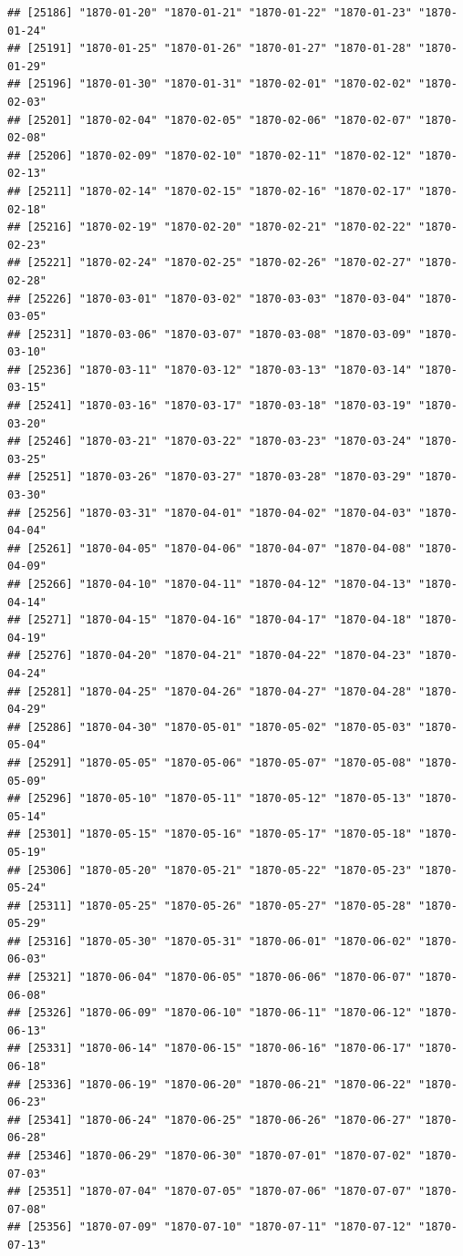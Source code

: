 \documentclass{article}\usepackage[]{graphicx}\usepackage[]{color}
\makeatletter
\newenvironment{kframe}{%
 \def\at@end@of@kframe{}%
 \ifinner\ifhmode%
  \def\at@end@of@kframe{\end{minipage}}%
  \begin{minipage}{\columnwidth}%
 \fi\fi%
 \def\FrameCommand##1{\hskip\@totalleftmargin \hskip-\fboxsep
 \colorbox{shadecolor}{##1}\hskip-\fboxsep
     \hskip-\linewidth \hskip-\@totalleftmargin \hskip\columnwidth}%
 \MakeFramed {\advance\hsize-\width
   \@totalleftmargin\z@ \linewidth\hsize
   \@setminipage}}%
 {\par\unskip\endMakeFramed%
 \at@end@of@kframe}
\newenvironment{knitrout}{}{} %
\makeatother
\begin{document}
\begin{description}
\begin{knitrout}
\begin{kframe}
\begin{verbatim}
## [25186] "1870-01-20" "1870-01-21" "1870-01-22" "1870-01-23" "1870-01-24"
## [25191] "1870-01-25" "1870-01-26" "1870-01-27" "1870-01-28" "1870-01-29"
## [25196] "1870-01-30" "1870-01-31" "1870-02-01" "1870-02-02" "1870-02-03"
## [25201] "1870-02-04" "1870-02-05" "1870-02-06" "1870-02-07" "1870-02-08"
## [25206] "1870-02-09" "1870-02-10" "1870-02-11" "1870-02-12" "1870-02-13"
## [25211] "1870-02-14" "1870-02-15" "1870-02-16" "1870-02-17" "1870-02-18"
## [25216] "1870-02-19" "1870-02-20" "1870-02-21" "1870-02-22" "1870-02-23"
## [25221] "1870-02-24" "1870-02-25" "1870-02-26" "1870-02-27" "1870-02-28"
## [25226] "1870-03-01" "1870-03-02" "1870-03-03" "1870-03-04" "1870-03-05"
## [25231] "1870-03-06" "1870-03-07" "1870-03-08" "1870-03-09" "1870-03-10"
## [25236] "1870-03-11" "1870-03-12" "1870-03-13" "1870-03-14" "1870-03-15"
## [25241] "1870-03-16" "1870-03-17" "1870-03-18" "1870-03-19" "1870-03-20"
## [25246] "1870-03-21" "1870-03-22" "1870-03-23" "1870-03-24" "1870-03-25"
## [25251] "1870-03-26" "1870-03-27" "1870-03-28" "1870-03-29" "1870-03-30"
## [25256] "1870-03-31" "1870-04-01" "1870-04-02" "1870-04-03" "1870-04-04"
## [25261] "1870-04-05" "1870-04-06" "1870-04-07" "1870-04-08" "1870-04-09"
## [25266] "1870-04-10" "1870-04-11" "1870-04-12" "1870-04-13" "1870-04-14"
## [25271] "1870-04-15" "1870-04-16" "1870-04-17" "1870-04-18" "1870-04-19"
## [25276] "1870-04-20" "1870-04-21" "1870-04-22" "1870-04-23" "1870-04-24"
## [25281] "1870-04-25" "1870-04-26" "1870-04-27" "1870-04-28" "1870-04-29"
## [25286] "1870-04-30" "1870-05-01" "1870-05-02" "1870-05-03" "1870-05-04"
## [25291] "1870-05-05" "1870-05-06" "1870-05-07" "1870-05-08" "1870-05-09"
## [25296] "1870-05-10" "1870-05-11" "1870-05-12" "1870-05-13" "1870-05-14"
## [25301] "1870-05-15" "1870-05-16" "1870-05-17" "1870-05-18" "1870-05-19"
## [25306] "1870-05-20" "1870-05-21" "1870-05-22" "1870-05-23" "1870-05-24"
## [25311] "1870-05-25" "1870-05-26" "1870-05-27" "1870-05-28" "1870-05-29"
## [25316] "1870-05-30" "1870-05-31" "1870-06-01" "1870-06-02" "1870-06-03"
## [25321] "1870-06-04" "1870-06-05" "1870-06-06" "1870-06-07" "1870-06-08"
## [25326] "1870-06-09" "1870-06-10" "1870-06-11" "1870-06-12" "1870-06-13"
## [25331] "1870-06-14" "1870-06-15" "1870-06-16" "1870-06-17" "1870-06-18"
## [25336] "1870-06-19" "1870-06-20" "1870-06-21" "1870-06-22" "1870-06-23"
## [25341] "1870-06-24" "1870-06-25" "1870-06-26" "1870-06-27" "1870-06-28"
## [25346] "1870-06-29" "1870-06-30" "1870-07-01" "1870-07-02" "1870-07-03"
## [25351] "1870-07-04" "1870-07-05" "1870-07-06" "1870-07-07" "1870-07-08"
## [25356] "1870-07-09" "1870-07-10" "1870-07-11" "1870-07-12" "1870-07-13"

\end{verbatim}
\end{kframe}
\end{knitrout}
\end{description}
\end{document}
